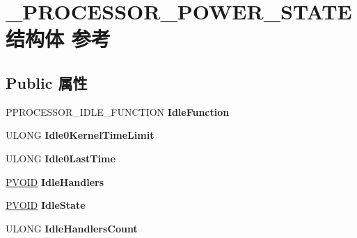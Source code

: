 \hypertarget{struct___p_r_o_c_e_s_s_o_r___p_o_w_e_r___s_t_a_t_e}{}\section{\+\_\+\+P\+R\+O\+C\+E\+S\+S\+O\+R\+\_\+\+P\+O\+W\+E\+R\+\_\+\+S\+T\+A\+T\+E结构体 参考}
\label{struct___p_r_o_c_e_s_s_o_r___p_o_w_e_r___s_t_a_t_e}
\subsection*{Public 属性}
\begin{DoxyCompactItemize}
\item 
\mbox{\label{struct___p_r_o_c_e_s_s_o_r___p_o_w_e_r___s_t_a_t_e_a26c3e0bbaa0ca9b95dab07046adcbbda}} 
P\+P\+R\+O\+C\+E\+S\+S\+O\+R\+\_\+\+I\+D\+L\+E\+\_\+\+F\+U\+N\+C\+T\+I\+ON {\bfseries Idle\+Function}
\item 
\mbox{\label{struct___p_r_o_c_e_s_s_o_r___p_o_w_e_r___s_t_a_t_e_a6c2a4f6137f3a5458597c5daf7d5418f}} 
U\+L\+O\+NG {\bfseries Idle0\+Kernel\+Time\+Limit}
\item 
\mbox{\label{struct___p_r_o_c_e_s_s_o_r___p_o_w_e_r___s_t_a_t_e_ae0f94988c68f6d27896dc24926b97b34}} 
U\+L\+O\+NG {\bfseries Idle0\+Last\+Time}
\item 
\mbox{\label{struct___p_r_o_c_e_s_s_o_r___p_o_w_e_r___s_t_a_t_e_a62b7c7309539a0fbfbf44051a18f6797}} 
\hyperlink{interfacevoid}{P\+V\+O\+ID} {\bfseries Idle\+Handlers}
\item 
\mbox{\label{struct___p_r_o_c_e_s_s_o_r___p_o_w_e_r___s_t_a_t_e_a9f29bf0de2cf7034bbb4941879c8a14b}} 
\hyperlink{interfacevoid}{P\+V\+O\+ID} {\bfseries Idle\+State}
\item 
\mbox{\label{struct___p_r_o_c_e_s_s_o_r___p_o_w_e_r___s_t_a_t_e_a6855ed05f137720ae30b8619e74dd7ae}} 
U\+L\+O\+NG {\bfseries Idle\+Handlers\+Count}

\end{DoxyCompactItemize}
